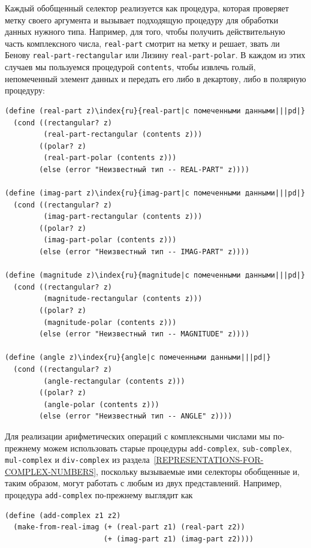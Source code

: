 Каждый  обобщенный селектор реализуется как процедура,
которая проверяет метку своего аргумента и вызывает подходящую
процедуру для обработки данных нужного типа.  Например, для того, чтобы получить
действительную часть комплексного числа, {\tt real-part}
смотрит на метку и решает, звать ли Бенову
{\tt real-part-rectangular} или Лизину
{\tt real-part-polar}.  В каждом из этих случаев мы пользуемся
процедурой {\tt contents}, чтобы извлечь голый, непомеченный
элемент данных и передать его либо в декартову, либо в полярную
процедуру:

\begin{Verbatim}[fontsize=\small]
(define (real-part z)\index{ru}{real-part|с помеченными данными|||pd|}
  (cond ((rectangular? z) 
         (real-part-rectangular (contents z)))
        ((polar? z)
         (real-part-polar (contents z)))
        (else (error "Неизвестный тип -- REAL-PART" z))))

(define (imag-part z)\index{ru}{imag-part|с помеченными данными|||pd|}
  (cond ((rectangular? z)
         (imag-part-rectangular (contents z)))
        ((polar? z)
         (imag-part-polar (contents z)))
        (else (error "Неизвестный тип -- IMAG-PART" z))))

(define (magnitude z)\index{ru}{magnitude|с помеченными данными|||pd|}
  (cond ((rectangular? z)
         (magnitude-rectangular (contents z)))
        ((polar? z)
         (magnitude-polar (contents z)))
        (else (error "Неизвестный тип -- MAGNITUDE" z))))

(define (angle z)\index{ru}{angle|с помеченными данными|||pd|}
  (cond ((rectangular? z)
         (angle-rectangular (contents z)))
        ((polar? z)
         (angle-polar (contents z)))
        (else (error "Неизвестный тип -- ANGLE" z))))
\end{Verbatim}

Для реализации арифметических операций с комплексными
числами мы по-прежнему можем использовать старые  процедуры
{\tt add-complex}, {\tt sub-com\-plex},
{\tt mul-complex} и {\tt div-complex} из 
раздела~\ref{REPRESENTATIONS-FOR-COMPLEX-NUMBERS}, поскольку
вызываемые ими селекторы обобщенные и, таким образом, могут работать с любым 
из двух представлений.  Например, процедура {\tt add-complex}
по-прежнему выглядит как

\begin{Verbatim}[fontsize=\small]
(define (add-complex z1 z2)
  (make-from-real-imag (+ (real-part z1) (real-part z2))
                       (+ (imag-part z1) (imag-part z2))))
\end{Verbatim}

